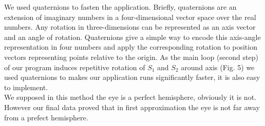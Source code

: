 \documentclass{article}
\begin{document}
We used quaternions to fasten the application. Briefly, quaternions are an extension of imaginary numbers in a four-dimensional vector space over the real numbers. Any rotation in three-dimensions can be represented as an axis vector and an angle of rotation. 
Quaternions give a simple way to encode this axis-angle representation in four numbers and apply the corresponding rotation to position vectors representing points relative to the origin\cite{ref6}. 
As the main loop (second step) of our program induces repetitive rotation of $S_{1}$ and $S_{2}$ around axis (Fig. 5) we used quaternions to makes our application runs significantly faster, it is also easy to implement.\\
We supposed in this method the eye is a perfect hemisphere, obviously it is not. However our final data proved that in first approximation the eye is not far away from a prefect hemisphere. 
\end{document}
